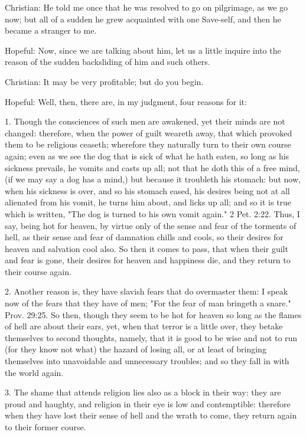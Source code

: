 Christian: He told me once that he was resolved to go on pilgrimage, as
we go now; but all of a sudden he grew acquainted with one Save-self,
and then he became a stranger to me.

Hopeful: Now, since we are talking about him, let us a little inquire
into the reason of the sudden backsliding of him and such others.

Christian: It may be very profitable; but do you begin.

Hopeful: Well, then, there are, in my judgment, four reasons for it:

1. Though the consciences of such men are awakened, yet their minds are
not changed: therefore, when the power of guilt weareth away, that
which provoked them to be religious ceaseth; wherefore they naturally
turn to their own course again; even as we see the dog that is sick of
what he hath eaten, so long as his sickness prevails, he vomits and
casts up all; not that he doth this of a free mind, (if we may say a
dog has a mind,) but because it troubleth his stomach: but now, when
his sickness is over, and so his stomach eased, his desires being not
at all alienated from his vomit, he turns him about, and licks up all;
and so it is true which is written, "The dog is turned to his own vomit
again." 2 Pet. 2:22. Thus, I say, being hot for heaven, by virtue only
of the sense and fear of the torments of hell, as their sense and fear
of damnation chills and cools, so their desires for heaven and
salvation cool also. So then it comes to pass, that when their guilt
and fear is gone, their desires for heaven and happiness die, and they
return to their course again.

2. Another reason is, they have slavish fears that do overmaster them:
I speak now of the fears that they have of men; "For the fear of man
bringeth a snare." Prov. 29:25. So then, though they seem to be hot for
heaven so long as the flames of hell are about their ears, yet, when
that terror is a little over, they betake themselves to second
thoughts, namely, that it is good to be wise and not to run (for they
know not what) the hazard of losing all, or at least of bringing
themselves into unavoidable and unnecessary troubles; and so they fall
in with the world again.

3. The shame that attends religion lies also as a block in their way:
they are proud and haughty, and religion in their eye is low and
contemptible: therefore when they have lost their sense of hell and the
wrath to come, they return again to their former course.

